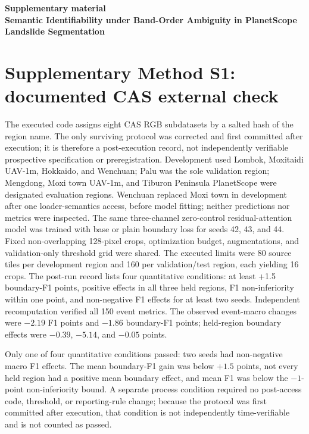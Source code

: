 \documentclass[11pt,a4paper]{article}
\begin{document}
\begin{center}
\textbf{\Large Supplementary material}\\[0.5em]
\textbf{Semantic Identifiability under Band-Order Ambiguity in PlanetScope Landslide Segmentation}
\end{center}

\section*{Supplementary Method S1: documented CAS external check}

The executed code assigns eight CAS RGB subdatasets by a salted hash of the
region name. The only surviving protocol was corrected and first committed
after execution; it is therefore a post-execution record, not independently
verifiable prospective specification or preregistration. Development used Lombok,
Moxitaidi UAV-1m, Hokkaido, and Wenchuan; Palu was the sole validation region;
Mengdong, Moxi town UAV-1m, and Tiburon Peninsula PlanetScope were designated
evaluation regions. Wenchuan replaced Moxi town in development after one
loader-semantics access, before model fitting; neither predictions nor metrics
were inspected. The same three-channel zero-control residual-attention model
was trained with base or plain boundary loss for seeds 42, 43, and 44. Fixed
non-overlapping 128-pixel crops, optimization budget, augmentations, and
validation-only threshold grid were shared. The executed limits were 80 source
tiles per development region and 160 per validation/test region, each yielding
16 crops. The post-run record lists four quantitative conditions: at least
+1.5 boundary-F1 points, positive effects in all three held regions, F1
non-inferiority within one point, and non-negative F1 effects for at least two
seeds. Independent recomputation verified all 150 event metrics.
The observed event-macro changes were $-2.19$ F1 points and $-1.86$ boundary-F1
points; held-region boundary effects were $-0.39$, $-5.14$, and $-0.05$ points.

\begin{table}[htbp]
\centering
\caption{Paired plain-boundary minus base-loss effects by designated CAS region and
seed, in F1/boundary-F1 percentage points. The macro row averages the three
regions within each seed.}
\label{tab:s1}

\end{table}

Only one of four quantitative conditions passed: two seeds had non-negative macro F1
effects. The mean boundary-F1 gain was below $+1.5$ points, not every held
region had a positive mean boundary effect, and mean F1 was below the
$-1$-point non-inferiority bound. A separate process condition required no
post-access code, threshold, or reporting-rule change; because the protocol
was first committed after execution, that condition is not independently
time-verifiable and is not counted as passed.
\end{document}
